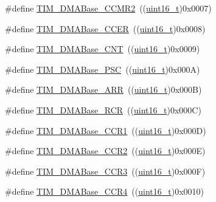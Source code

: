 \begin{DoxyCompactItemize}
\item 
\#define \hyperlink{group___t_i_m___d_m_a___base__address_ga4989f74592ab359f30bd7c4a4a457571}{T\+I\+M\+\_\+\+D\+M\+A\+Base\+\_\+\+C\+C\+M\+R2}~((\hyperlink{_p_e___types_8h_a1f1825b69244eb3ad2c7165ddc99c956}{uint16\+\_\+t})0x0007)
\item 
\#define \hyperlink{group___t_i_m___d_m_a___base__address_ga6935639db5738662520e8d0eb7116dd6}{T\+I\+M\+\_\+\+D\+M\+A\+Base\+\_\+\+C\+C\+ER}~((\hyperlink{_p_e___types_8h_a1f1825b69244eb3ad2c7165ddc99c956}{uint16\+\_\+t})0x0008)
\item 
\#define \hyperlink{group___t_i_m___d_m_a___base__address_gacab604257d144cf3a59b360cbc958ec9}{T\+I\+M\+\_\+\+D\+M\+A\+Base\+\_\+\+C\+NT}~((\hyperlink{_p_e___types_8h_a1f1825b69244eb3ad2c7165ddc99c956}{uint16\+\_\+t})0x0009)
\item 
\#define \hyperlink{group___t_i_m___d_m_a___base__address_gab8dd06970f235fe9f6997e0975237388}{T\+I\+M\+\_\+\+D\+M\+A\+Base\+\_\+\+P\+SC}~((\hyperlink{_p_e___types_8h_a1f1825b69244eb3ad2c7165ddc99c956}{uint16\+\_\+t})0x000\+A)
\item 
\#define \hyperlink{group___t_i_m___d_m_a___base__address_gaab8a66f70e59b5916b4bba344746d652}{T\+I\+M\+\_\+\+D\+M\+A\+Base\+\_\+\+A\+RR}~((\hyperlink{_p_e___types_8h_a1f1825b69244eb3ad2c7165ddc99c956}{uint16\+\_\+t})0x000\+B)
\item 
\#define \hyperlink{group___t_i_m___d_m_a___base__address_ga97f9edceee5c99b32aaa2c6daf849b7d}{T\+I\+M\+\_\+\+D\+M\+A\+Base\+\_\+\+R\+CR}~((\hyperlink{_p_e___types_8h_a1f1825b69244eb3ad2c7165ddc99c956}{uint16\+\_\+t})0x000\+C)
\item 
\#define \hyperlink{group___t_i_m___d_m_a___base__address_ga235a47fa47fd19594a111e6e48c0d5a2}{T\+I\+M\+\_\+\+D\+M\+A\+Base\+\_\+\+C\+C\+R1}~((\hyperlink{_p_e___types_8h_a1f1825b69244eb3ad2c7165ddc99c956}{uint16\+\_\+t})0x000\+D)
\item 
\#define \hyperlink{group___t_i_m___d_m_a___base__address_ga0e2150dcd3afe31ecb793aa471b3b972}{T\+I\+M\+\_\+\+D\+M\+A\+Base\+\_\+\+C\+C\+R2}~((\hyperlink{_p_e___types_8h_a1f1825b69244eb3ad2c7165ddc99c956}{uint16\+\_\+t})0x000\+E)
\item 
\#define \hyperlink{group___t_i_m___d_m_a___base__address_ga590c90085bd2b206b941dff2731fed74}{T\+I\+M\+\_\+\+D\+M\+A\+Base\+\_\+\+C\+C\+R3}~((\hyperlink{_p_e___types_8h_a1f1825b69244eb3ad2c7165ddc99c956}{uint16\+\_\+t})0x000\+F)
\item 
\#define \hyperlink{group___t_i_m___d_m_a___base__address_ga5e84a16e7d8ea369a3a55bb6fe1f2171}{T\+I\+M\+\_\+\+D\+M\+A\+Base\+\_\+\+C\+C\+R4}~((\hyperlink{_p_e___types_8h_a1f1825b69244eb3ad2c7165ddc99c956}{uint16\+\_\+t})0x0010)

\end{DoxyCompactItemize}
